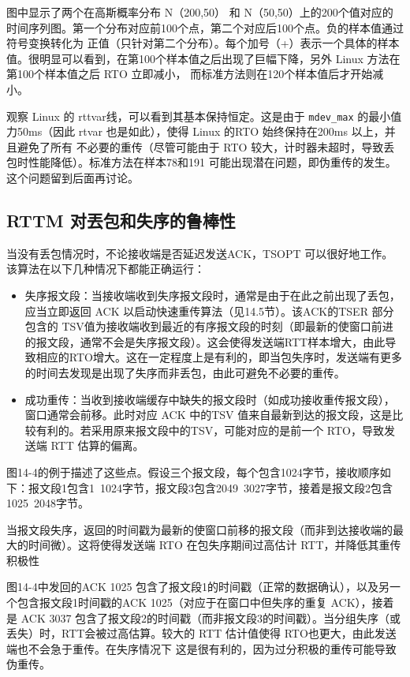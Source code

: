 图中显示了两个在高斯概率分布 N（200,50） 和 N（50,50）上的200个值对应的时间序列图。第一个分布对应前100个点，第二个对应后100个点。负的样本值通过符号变换转化为
正值（只针对第二个分布）。每个加号（+）表示一个具体的样本值。很明显可以看到，在第100个样本值之后出现了巨幅下降，另外 Linux 方法在第100个样本值之后 RTO 立即减小，
而标准方法则在120个样本值后才开始减小。

观察 Linux 的 rttvar线，可以看到其基本保持恒定。这是由于 \verb|mdev_max| 的最小值力50ms（因此 rtvar 也是如此），使得 Linux 的RTO 始终保持在200ms 以上，并且避免了所有
不必要的重传（尽管可能由于 RTO 较大，计时器未超时，导致丢包时性能降低）。标准方法在样本78和191 可能出现潜在问题，即伪重传的发生。这个问题留到后面再讨论。

\subsection{RTTM 对丟包和失序的鲁棒性}

当没有丢包情况时，不论接收端是否延迟发送ACK，TSOPT 可以很好地工作。该算法在以下几种情况下都能正确运行：
\begin{itemize}
    \item 失序报文段：当接收端收到失序报文段时，通常是由于在此之前出现了丢包，应当立即返回 ACK 以启动快速重传算法（见14.5节）。该ACK的TSER 部分包含的 TSV值为接收端收到最近的有序报文段的时刻（即最新的使窗口前进的报文段，通常不会是失序报文段）。这会使得发送端RTT样本增大，由此导致相应的RTO增大。这在一定程度上是有利的，即当包失序时，发送端有更多的时间去发现是出现了失序而非丢包，由此可避免不必要的重传。
    \item 成功重传：当收到接收端缓存中缺失的报文段时（如成功接收重传报文段），窗口通常会前移。此时对应 ACK 中的TSV 值来自最新到达的报文段，这是比较有利的。若采用原来报文段中的TSV，可能对应的是前一个 RTO，导致发送端 RTT 估算的偏离。
\end{itemize}

图14-4的例于描述了这些点。假设三个报文段，每个包含1024字节，接收顺序如下：报文段1包含1~1024字节，报文段3包含2049~3027字节，接着是报文段2包含1025~2048字节。

当报文段失序，返回的时间戳为最新的使窗口前移的报文段（而非到达接收端的最大的时间微）。这将使得发送端 RTO 在包失序期间过高估计 RTT，并降低其重传积极性

图14-4中发回的ACK 1025 包含了报文段1的时间戳（正常的数据确认），以及另一个包含报文段1时间戳的ACK 1025（对应于在窗口中但失序的重复 ACK），接着是 ACK 3037
包含了报文段2的时间戳（而非报文段3的时间戳）。当分组失序（或丢失）时，RTT会被过高估算。较大的 RTT 估计值使得 RTO也更大，由此发送端也不会急于重传。在失序情况下
这是很有利的，因为过分积极的重传可能导致伪重传。

